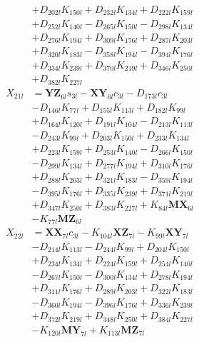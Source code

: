 \begin{multicols}{2}
\begin{align}
&+ D_{202l}K_{150l} + D_{232l}K_{134l} + D_{222l}K_{159l}  \nonumber \\
&+ D_{252l}K_{140l} - D_{265l}K_{150l} - D_{298l}K_{134l}  \nonumber \\
&+ D_{276l}K_{194l} + D_{309l}K_{176l} + D_{287l}K_{203l}  \nonumber \\
&+ D_{320l}K_{183l} - D_{358l}K_{194l} - D_{394l}K_{176l}  \nonumber \\
&+ D_{334l}K_{239l} + D_{370l}K_{219l} + D_{346l}K_{250l}  \nonumber \\
&+ D_{382l}K_{227l} \nonumber \\
X_{21l} &= \mathbf{YZ}_{6l}s_{3l} - \mathbf{XY}_{6l}c_{3l} - D_{173l}c_{3l}  \nonumber \\
&- D_{146l}K_{77l} + D_{155l}K_{113l} + D_{182l}K_{99l}  \nonumber \\
&+ D_{164l}K_{120l} + D_{191l}K_{104l} - D_{213l}K_{113l}  \nonumber \\
&- D_{243l}K_{99l} + D_{203l}K_{150l} + D_{233l}K_{134l}  \nonumber \\
&+ D_{223l}K_{159l} + D_{253l}K_{140l} - D_{266l}K_{150l}  \nonumber \\
&- D_{299l}K_{134l} + D_{277l}K_{194l} + D_{310l}K_{176l}  \nonumber \\
&+ D_{288l}K_{203l} + D_{321l}K_{183l} - D_{359l}K_{194l}  \nonumber \\
&- D_{395l}K_{176l} + D_{335l}K_{239l} + D_{371l}K_{219l}  \nonumber \\
&+ D_{347l}K_{250l} + D_{383l}K_{227l} + K_{84l}\mathbf{MX}_{6l}  \nonumber \\
&- K_{77l}\mathbf{MZ}_{6l} \nonumber \\
X_{22l} &= \mathbf{XX}_{7l}c_{3l} - K_{104l}\mathbf{XZ}_{7l} - K_{99l}\mathbf{XY}_{7l}  \nonumber \\
&- D_{214l}K_{113l} - D_{244l}K_{99l} + D_{204l}K_{150l}  \nonumber \\
&+ D_{234l}K_{134l} + D_{224l}K_{159l} + D_{254l}K_{140l}  \nonumber \\
&- D_{267l}K_{150l} - D_{300l}K_{134l} + D_{278l}K_{194l}  \nonumber \\
&+ D_{311l}K_{176l} + D_{289l}K_{203l} + D_{322l}K_{183l}  \nonumber \\
&- D_{360l}K_{194l} - D_{396l}K_{176l} + D_{336l}K_{239l}  \nonumber \\
&+ D_{372l}K_{219l} + D_{348l}K_{250l} + D_{384l}K_{227l}  \nonumber \\
&- K_{120l}\mathbf{MY}_{7l} + K_{113l}\mathbf{MZ}_{7l} \nonumber \\

\end{align}
\end{multicols}
